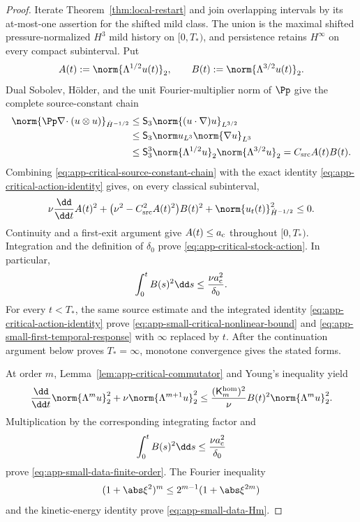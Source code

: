 \begin{proof}
Iterate Theorem~\ref{thm:local-restart} and join overlapping intervals by
its at-most-one assertion for the shifted mild class.  The union is the
maximal shifted pressure-normalized \(H^3\) mild history on \([0,T_*)\), and
persistence retains \(H^\infty\) on
every compact subinterval.  Put
\[
 A(t):=\norm{\Lambda^{1/2}u(t)}_2,
 \qquad
 B(t):=\norm{\Lambda^{3/2}u(t)}_2.
\]
 Dual Sobolev, H\"older, and the unit Fourier-multiplier norm of \(\Pp\)
give the complete source-constant chain
\begin{align}
 \norm{\Pp\nabla\!\cdot(u\otimes u)}_{\dot H^{-1/2}}
 &\le \mathsf S_3\norm{(u\cdot\nabla)u}_{L^{3/2}}
 \notag\\
 &\le \mathsf S_3\norm u_{L^3}\norm{\nabla u}_{L^3}
 \notag\\
 &\le \mathsf S_3^3
      \norm{\Lambda^{1/2}u}_2
      \norm{\Lambda^{3/2}u}_2
 =C_{\rm src}A(t)B(t).
 \label{eq:app-critical-source-constant-chain}
\end{align}
Combining \eqref{eq:app-critical-source-constant-chain} with the exact
identity \eqref{eq:app-critical-action-identity} gives, on every classical
subinterval,
\[
 \nu\frac{\dd}{\dd t}A(t)^2
 +\bigl(\nu^2-C_{\rm src}^2A(t)^2\bigr)B(t)^2
 +\norm{u_t(t)}_{\dot H^{-1/2}}^2\le0.
\]
Continuity and a first-exit argument give \(A(t)\le a_{\rm c}\) throughout
\([0,T_*)\).  Integration and the definition of \(\delta_0\) prove
\eqref{eq:app-critical-stock-action}.  In particular,
\[
 \int_0^tB(s)^2\dd s\le\frac{\nu a_{\rm c}^2}{\delta_0}.
\]
For every \(t<T_*\), the same source estimate and the integrated identity
\eqref{eq:app-critical-action-identity} prove
\eqref{eq:app-small-critical-nonlinear-bound} and
\eqref{eq:app-small-first-temporal-response} with \(\infty\) replaced by
\(t\).  After the continuation argument below proves \(T_*=\infty\),
monotone convergence gives the stated forms.

At order \(m\), Lemma~\ref{lem:app-critical-commutator} and Young's
inequality yield
\[
 \frac{\dd}{\dd t}\norm{\Lambda^mu}_2^2
 +\nu\norm{\Lambda^{m+1}u}_2^2
 \le
 \frac{(\mathsf K_m^{\rm hom})^2}{\nu}
 B(t)^2\norm{\Lambda^mu}_2^2.
\]
Multiplication by the corresponding integrating factor and
\[
 \int_0^tB(s)^2\dd s\le\frac{\nu a_{\rm c}^2}{\delta_0}
\]
prove \eqref{eq:app-small-data-finite-order}.  The Fourier inequality
\[
 (1+\abs\xi^2)^m\le2^{m-1}(1+\abs\xi^{2m})
\]
and the kinetic-energy identity prove \eqref{eq:app-small-data-Hm}.


\end{proof}
